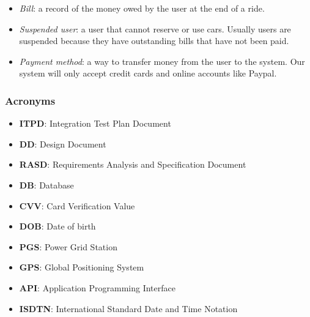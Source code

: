 \documentclass[english]{article}
\begin{document}
\begin{itemize}
\item{\textit{Bill}: a record of the money owed by the user at the end of a ride.}
\item{\textit{Suspended user}: a user that cannot reserve or use cars. Usually users are suspended because they have outstanding bills that have not been paid.}
\item{\textit{Payment method}: a way to transfer money from the user to the system. Our system will only accept credit cards and online accounts like Paypal.}
\end{itemize}

\subsubsection{Acronyms}
\begin{itemize}
\item{\textbf{ITPD}: Integration Test Plan Document}
\item{\textbf{DD}: Design Document}
\item{\textbf{RASD}: Requirements Analysis and Specification Document}
\item{\textbf{DB}: Database}
\item{\textbf{CVV}: Card Verification Value}
\item{\textbf{DOB}: Date of birth}
\item{\textbf{PGS}: Power Grid Station}
\item{\textbf{GPS}: Global Positioning System}
\item{\textbf{API}: Application Programming Interface}
\item{\textbf{ISDTN}: International Standard Date and Time Notation}
\end{itemize}

\end{document}
